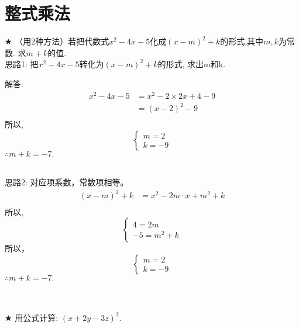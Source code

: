 \section{整式乘法}

\item {
    $\bigstar$
    （用2种方法）若把代数式$x^2-4x-5$化成$(x-m)^2+k$的形式,其中$m,k$为常数. 求$m+k$的值.
    \ifshowSolution
        \fangsong{}
        \\
        思路1: 把$x^2-4x-5$转化为$(x-m)^2+k$的形式, 求出m和k.

        解答: 
        \begin{align*}
            x^2-4x-5 &= x^2 - 2\times 2x + 4 - 9 \\
            &= (x-2)^2 - 9 \\
        \end{align*}
        所以,
        \[\left\{ 
            \begin{array}{lc}
                m = 2\\
                k =-9
            \end{array}
        \right.\]
        $\therefore m+k=-7.$
        \\
        \\
        思路2: 对应项系数，常数项相等。
        \begin{align*}
            (x-m)^2+k &= x^2 - 2m\cdot x + m^2 + k \\
        \end{align*}
        所以,
        \[\left\{ 
            \begin{array}{lc}
                4 = 2m\\
                -5 = m^2 + k
            \end{array}
        \right.\]
        所以，
        \[\left\{ 
            \begin{array}{lc}
                m = 2\\
                k =-9
            \end{array}
        \right.\]
        $\therefore m+k=-7.$
    \else
        \\ \\ \\
    \fi
}

\item {
    $\bigstar$
    用公式计算: $(x+2y-3z)^2$.
    \\ \\ \\
}

